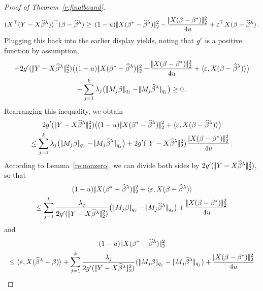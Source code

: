 \documentclass[bj]{imsart}
\newcommand{\normtwo}[1]{\ensuremath{\!|\!| #1 | \! |_{2}}}
\newcommand{\normqj}[1]{\ensuremath{\!|\!| #1 | \! |_{q_j}}}
\newcommand{\1}{{\rm 1}\mskip -4,5mu{\rm l} }
\newcommand{\betatrue}{\beta^*}
\newcommand{\genbeta}{\textcolor{black}{\beta}}
\newcommand{\genconstant}{\textcolor{black}{\ensuremath{u}}}
\begin{document}
\begin{proof}[Proof of Theorem~\ref{r:finalbound}]
  \begin{equation*}
    (\design^\top(\outcome-\design\estimatort))^\top(\genbeta-\estimatort)\geq \,(1-\genconstant)\,\normtwo{\design(\betatrue-\estimatort)}^2-\frac{\normtwo{\design(\genbeta-\betatrue)}^2}{4\genconstant} + \noise^\top \design(\genbeta-\estimatort)\,.
  \end{equation*}
Plugging this back into the earlier display yields, noting that $g'$ is a positive function by assumption,
\begin{multline*}
 -2g'(\,\normtwo{\outcome-\design\estimatort}^2)\big((1-\genconstant)\, \normtwo{\design(\betatrue-\estimatort)}^2-\frac{\normtwo{\design(\genbeta-\betatrue)}^2}{4\genconstant} +\langle \noise, \design(\genbeta-\estimatort)\rangle\big)\\
+\sum_{j=1}^{\numbergroups}\lambda_j\big(\,\normqj{ \fusedmatrix_j \genbeta}-\normqj{\fusedmatrix_j\estimatort}\big)\ge 0\,.
\end{multline*}
Rearranging this inequality, we obtain
\begin{multline*}
2g'(\,\normtwo{\outcome-\design\estimatort}^2)\big((1-\genconstant)\, \normtwo{\design(\betatrue-\estimatort)}^2+\langle \noise, \design(\genbeta-\estimatort)\rangle \big)\\ \le \sum_{j=1}^{\numbergroups}\lambda_j\big(\,\normqj{ \fusedmatrix_j \genbeta}-\normqj{\fusedmatrix_j\estimatort}\big)+2g'(\,\normtwo{\outcome-\design\estimatort}^2)\,\frac{\normtwo{\design(\genbeta-\betatrue)}^2}{4\genconstant}\,.
\end{multline*}
According to Lemma~\ref{re:nonzero},  we can divide both sides by $2g'(\,\normtwo{\outcome-\design\estimatort}^2)$, so that
\begin{multline*}
 (1-\genconstant)\,\normtwo{\design(\betatrue-\estimatort)}^2+\langle \noise, \design(\genbeta-\estimatort)\rangle \\
\le \sum_{j=1}^{\numbergroups}\frac{\lambda_j}{2g'(\,\normtwo{\outcome-\design\estimatort}^2)}\big(\,\normqj{ \fusedmatrix_j \genbeta}-\normqj{ \fusedmatrix_j\estimatort}\big)+\frac{\normtwo{\design(\genbeta-\betatrue)}^2}{4\genconstant}
\end{multline*}
and
\begin{multline*}
(1-\genconstant)\, \normtwo{\design(\betatrue-\estimatort)}^2 \\
\le \langle \noise, \design(\estimatort-\genbeta)\rangle+ \sum_{j=1}^{\numbergroups}\frac{\lambda_j}{2g'(\,\normtwo{\outcome-\design\estimatort}^2)}(\,\normqj{ \fusedmatrix_j \genbeta}-\,\normqj{\fusedmatrix_j\estimatort})+\frac{\normtwo{\design(\genbeta-\betatrue)}^2}{4\genconstant}

\end{multline*}
\end{proof}
\end{document}

